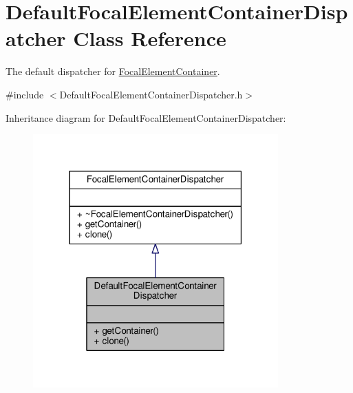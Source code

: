 \hypertarget{classDefaultFocalElementContainerDispatcher}{}\section{Default\+Focal\+Element\+Container\+Dispatcher Class Reference}
\label{classDefaultFocalElementContainerDispatcher}


The default dispatcher for \hyperlink{classFocalElementContainer}{Focal\+Element\+Container}.  




{\ttfamily \#include $<$Default\+Focal\+Element\+Container\+Dispatcher.\+h$>$}



Inheritance diagram for Default\+Focal\+Element\+Container\+Dispatcher\+:\nopagebreak
\begin{figure}[H]
\begin{center}
\leavevmode
\includegraphics[width=267pt]{classDefaultFocalElementContainerDispatcher__inherit__graph}
\end{center}
\end{figure}


